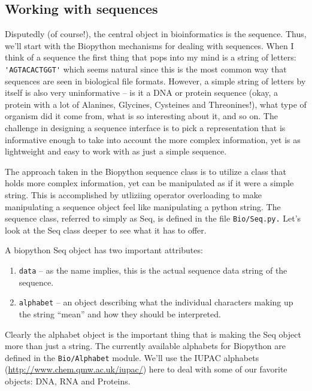 \documentclass{article}
\begin{document}
\subsection{Working with sequences}

Disputedly (of course!), the central object in bioinformatics is the sequence. Thus, we'll start with the Biopython mechanisms for dealing with sequences. When I think of a sequence the first thing that pops into my mind is a string of letters:\verb| 'AGTACACTGGT'| which seems natural since this is the most common way that sequences are seen in biological file formats.  However, a simple string of letters by itself is also very uninformative -- is it a DNA or  protein sequence (okay, a protein with a lot of Alanines, Glycines, Cysteines and Threonines!), what type of organism did it come from, what is so interesting about it, and so on. The challenge in designing a sequence interface is to pick a representation that is informative enough to take into account the more complex information, yet is as lightweight and easy to work with as just a simple sequence.


The approach taken in the Biopython sequence class is to utilize a class that holds more complex information, yet can be manipulated as if it were a simple string. This is accomplished by utliziing operator overloading to make manipulating a sequence object feel like manipulating a python string. The sequence class, referred to simply as Seq,  is defined in the file \verb|Bio/Seq.py.| Let's look at the Seq class deeper to see what it has to offer.


A biopython Seq object has two important attributes:

\begin{enumerate}

\item \verb|data| -- as the name implies, this is the actual sequence data string of the sequence.

\item \verb|alphabet| -- an object describing what the individual characters making up the string ``mean'' and how they should be interpreted.

\end{enumerate}

Clearly the alphabet object is the important thing that is making the Seq object more than just a string. The currently available alphabets for Biopython are defined in the \verb|Bio/Alphabet| module. We'll use the IUPAC alphabets \ahrefurl ({\url{http://www.chem.qmw.ac.uk/iupac/}}) here to deal with some of our favorite objects: DNA, RNA and Proteins.  
\end{document}
